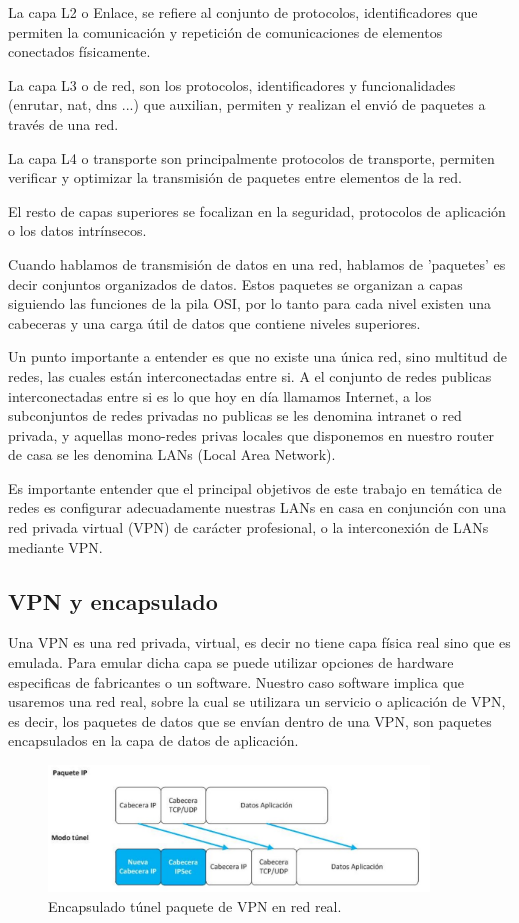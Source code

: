 La capa L2 o Enlace, se refiere al conjunto de protocolos, identificadores que permiten la comunicación y repetición de comunicaciones de elementos conectados físicamente.

La capa L3 o de red, son los protocolos, identificadores y funcionalidades (enrutar, nat, dns ...) que auxilian, permiten y realizan el envió de paquetes a través de una red. 

La capa L4 o transporte son principalmente protocolos de transporte, permiten verificar y optimizar la transmisión de paquetes entre elementos de la red.

El resto de capas superiores se focalizan en la seguridad, protocolos de aplicación o los datos intrínsecos.

Cuando hablamos de transmisión de datos en una red, hablamos de 'paquetes' es decir conjuntos organizados de datos. Estos paquetes se organizan a capas siguiendo las funciones de la pila OSI, por lo tanto para cada nivel existen una cabeceras y una carga útil de datos que contiene niveles superiores.

Un punto importante a entender es que no existe una única red, sino multitud de redes, las cuales están interconectadas entre si. A el conjunto de redes publicas interconectadas entre si es lo que hoy en día llamamos Internet, a los subconjuntos de redes privadas no publicas se les denomina intranet o red privada, y aquellas mono-redes privas locales que disponemos en nuestro router de casa se les denomina LANs (Local Area Network).

Es importante entender que el principal objetivos de este trabajo en temática de redes es configurar adecuadamente nuestras LANs en casa en conjunción con una red privada virtual (VPN) de carácter profesional, o la interconexión de LANs mediante VPN.

\subsection{VPN y encapsulado}
Una VPN es una red privada, virtual, es decir no tiene capa física real sino que es emulada. Para emular dicha capa se puede utilizar opciones de hardware especificas de fabricantes o un software. Nuestro caso software implica que usaremos una red real, sobre la cual se utilizara un servicio o aplicación de VPN, es decir, los paquetes de datos que se envían dentro de una VPN, son paquetes encapsulados en la capa de datos de aplicación.

\begin{figure}[!htb]
\begin{center}
\includegraphics[width=0.9\textwidth]{./figuras/tunel_paneque}
\caption{Encapsulado túnel paquete de  VPN en red real.}
\label{F:tunel_paneque}
\end{center}
\end{figure}

